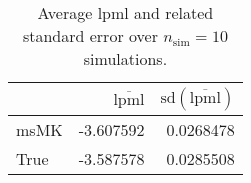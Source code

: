\begin{table}[H]

\caption{Average lpml and related standard error over $n_{\text{sim}} = 10$ simulations.}
\centering
\begin{tabular}[t]{lrr}
\toprule
  & $\overbar{\text{lpml}}$ & $\text{sd}(\overbar{\text{lpml}})$\\
\midrule
msMK & -3.607592 & 0.0268478\\
True & -3.587578 & 0.0285508\\
\bottomrule
\end{tabular}
\end{table}